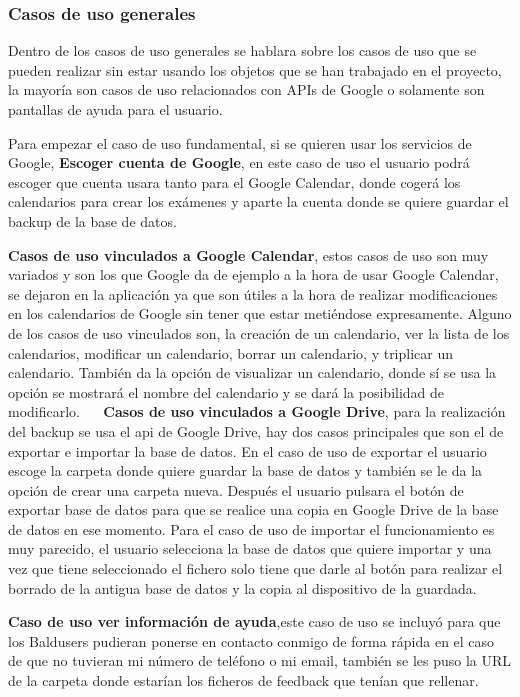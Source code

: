 \subsubsection{Casos de uso generales}
\label{subsubsecc:Casos de uso generales}

Dentro de los casos de uso generales se hablara sobre los casos de uso que se pueden realizar sin estar usando los objetos que se han trabajado en el proyecto, la mayoría son casos de uso relacionados con APIs de Google o solamente son pantallas de ayuda para el usuario.

Para empezar el caso de uso fundamental, si se quieren usar los servicios de Google, \textbf{Escoger cuenta de Google}, en este caso de uso el usuario podrá escoger que cuenta usara tanto para el Google Calendar, donde cogerá los calendarios para crear los exámenes y aparte la cuenta donde se quiere guardar el backup de la base de datos.

\textbf{Casos de uso vinculados a Google Calendar}, estos casos de uso son muy variados y son los que Google da de ejemplo a la hora de usar Google Calendar, se dejaron en la aplicación ya que son útiles a la hora de realizar modificaciones en los calendarios de Google sin tener que estar metiéndose expresamente.
Alguno de los casos de uso vinculados son, la creación de un calendario, ver la lista de los calendarios, modificar un calendario, borrar un calendario, y triplicar un calendario. También da la opción de visualizar un calendario, donde sí se usa la opción se mostrará el nombre del calendario y se dará la posibilidad de modificarlo.
 
\textbf{Casos de uso vinculados a Google Drive}, para la realización del backup se usa el api de Google Drive, hay dos casos principales que son el de exportar e importar la base de datos.
En el caso de uso de exportar el usuario escoge la carpeta donde quiere guardar la base de datos y también se le da la opción de crear una carpeta nueva.
Después el usuario pulsara el botón de exportar base de datos para que se realice una copia en Google Drive de la base de datos en ese momento.
Para el caso de uso de importar el funcionamiento es muy parecido, el usuario selecciona la base de datos que quiere importar y una vez que tiene seleccionado el fichero solo tiene que darle al botón para realizar el borrado de la antigua base de datos y la copia al dispositivo de la guardada.

\textbf{Caso de uso ver información de ayuda},este caso de uso se incluyó para que los Baldusers pudieran ponerse en contacto conmigo de forma rápida en el caso de que no tuvieran mi número de teléfono o mi email, también se les puso la URL de la carpeta donde estarían los ficheros de feedback que tenían que rellenar.

